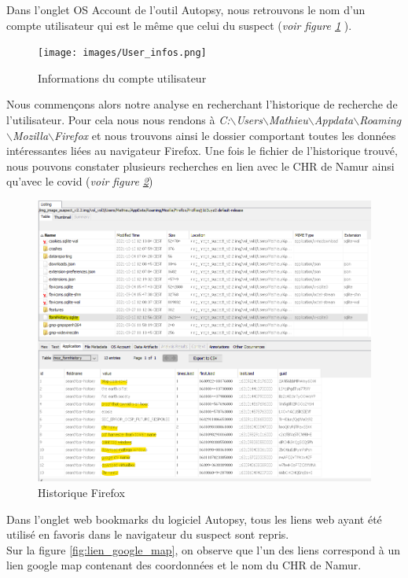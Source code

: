 \documentclass[a4paper]{article}
\begin{document}
Dans l'onglet OS Account de l'outil Autopsy, nous retrouvons le nom d'un compte utilisateur qui est le même que celui du suspect (\emph{voir figure \ref{fig:infos_user_suspect}} ).

\begin{figure}[H]
    \centering
    \texttt{[image: images/User\_infos.png]}
    \caption{Informations du compte utilisateur}
    \label{fig:infos_user_suspect}
\end{figure}

Nous commençons alors notre analyse en recherchant l'historique de recherche de l'utilisateur. Pour cela nous nous rendons à \emph{C{}:$\backslash$Users$\backslash$Mathieu$\backslash$Appdata$\backslash$Roaming$\backslash$Mozilla$\backslash$Firefox} et nous trouvons ainsi le dossier comportant toutes les données intéressantes liées au navigateur Firefox. Une fois le fichier de l'historique trouvé, nous pouvons constater plusieurs recherches en lien avec le CHR de Namur ainsi qu'avec le covid (\emph{voir figure \ref{fig:historique}})

\begin{figure}[H]
    \centering
    \includegraphics[width=14cm]{images/historique.png}
    \caption{Historique Firefox}
    \label{fig:historique}
\end{figure}

Dans l'onglet web bookmarks du logiciel Autopsy, tous les liens web ayant été utilisé en favoris dans le navigateur du suspect sont repris.\\
Sur la figure \ref{fig:lien_google_map}, on observe que l'un des liens correspond à un lien google map contenant des coordonnées et le nom du CHR de Namur.
\end{document}
